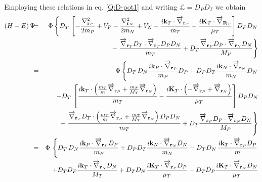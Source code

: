 Employing these relations in eq. \ref{Q:D-pot1} and writing $\pounds =
D_{P} D_{T} $ we obtain
%
\begin{eqnarray}\label{Q:D-Pot2}
\left( H - E \right) \Psi \!\!\!&=& \Phi \left\{ D_{T} \, \left[
-\frac{\nabla^{2}_{\vect{r}_{P}}}{2 m_{P}}+ V_{P} -\frac{
\nabla^{2}_{\vect{r}_{N}}}{2 m_{N}} + V_{N} - \frac{i \vect{k}_{T} \cdot
\overrightarrow{\nabla}_{\vect{r}_{T}} }{m_{T}} - \frac{i \vect{K}_{T}
\cdot \overrightarrow{\nabla}_{\vect{R}_{T}}}{\mu_{T}} \right] D_{P}
D_{N}
 \right.
\\
&&- \left. \frac{ \overrightarrow{\nabla}_{\vect{r}_{T}} D_{T} \cdot
\overrightarrow{\nabla}_{\vect{r}_{T}} D_{P} D_{N} }{m_{T}} + D_{T}
\frac{\overrightarrow{\nabla}_{\vect{r}_{P}}D_{P} \cdot
\overrightarrow{\nabla}_{\vect{r}_{N}}D_{N}}{M_{P}} \right\} \nonumber
\\
&=& \Phi \left\{ D_{T} \,  D_{N} \frac{i \vect{k}_{P}\cdot 
\overrightarrow{\nabla}_{\vect{r}_{P}}}{m_{P}}D_{P} +
D_{P}D_{T}\frac{i \vect{k}_{N} \cdot
\overrightarrow{\nabla}_{\vect{r}_{N}}}{m_{N}} D_{N} \right.\nonumber
 \\
&&- D_{T} \,\left[\frac{i \vect{k}_{T} \cdot \left( \frac{m_{T}}{m}
\overrightarrow{\nabla}_{\vect{r}_{P}} + \frac{m_{T}}{M_{T}}
\overrightarrow{\nabla}_{\vect{r}_{N}}\right) }{m_{T}} - \frac{i
\vect{K}_{T} \cdot \left( - \overrightarrow{\nabla}_{\vect{r}_{P}} +
\overrightarrow{\nabla}_{\vect{r}_{N}}\right) }{\mu_{T}} \right]  D_{P}
D_{N}\nonumber
\\
&&- \left. \frac{ \overrightarrow{\nabla}_{\vect{r}_{T}} D_{T} \cdot
\left( \frac{m_{T}}{m} \overrightarrow{\nabla}_{\vect{r}_{P}} +
\frac{m_{T}}{M_{T}} \overrightarrow{\nabla}_{\vect{r}_{N}}\right) D_{P}
D_{N} }{m_{T}} + D_{T} \frac{\overrightarrow{\nabla}_{\vect{r}_{P}}D_{P}
\cdot \overrightarrow{\nabla}_{\vect{r}_{N}}D_{N}}{M_{P}} \right\}
\nonumber
\\
&=& \Phi \, \left\{ D_{T} \,  D_{N} \frac{i \vect{k}_{P}\cdot
\overrightarrow{\nabla}_{\vect{r}_{P}}D_{P}}{m_{P}} +
D_{P}D_{T}\frac{i \vect{k}_{N} \cdot
\overrightarrow{\nabla}_{\vect{r}_{N}} D_{N}}{m_{N}} - D_{T} D_{N} \,
\frac{i \vect{k}_{T} \cdot \overrightarrow{\nabla}_{\vect{r}_{P}}
D_{P}}{m} \right. \nonumber
 \\
&&+ D_{T} D_{P} \frac{i \vect{k}_{T} \cdot
\overrightarrow{\nabla}_{\vect{r}_{N}} D_{N}}{M_{T}} + D_{T} D_{N}
\frac{i \vect{K}_{T} \cdot \overrightarrow{\nabla}_{\vect{r}_{P}}
D_{P}}{\mu_{T}} - D_{T} D_{P} \frac{i \vect{K}_{T} \cdot
\overrightarrow{\nabla}_{\vect{r}_{N}} D_{N}}{\mu_{T}} \nonumber
\\

\end{eqnarray}
